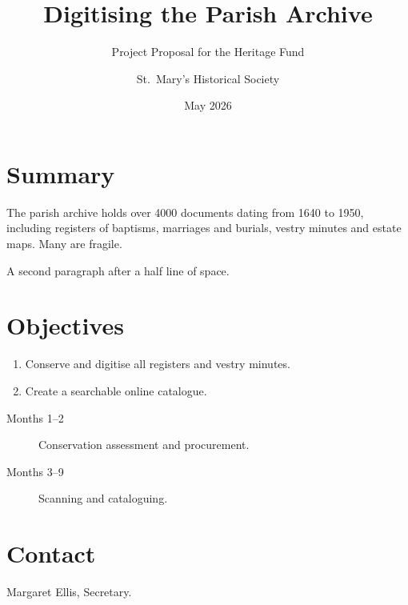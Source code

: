 \documentclass[paper=a4,fontsize=11pt,parskip=half]{scrartcl}
\title{Digitising the Parish Archive}
\subtitle{Project Proposal for the Heritage Fund}
\author{St.\ Mary's Historical Society}
\date{May 2026}
\begin{document}
\maketitle

\section{Summary}
The parish archive holds over 4000 documents dating from 1640 to 1950, including registers of baptisms, marriages and burials, vestry minutes and estate maps. Many are fragile.

A second paragraph after a half line of space.
\section{Objectives}
\begin{enumerate}
  \item Conserve and digitise all registers and vestry minutes.
  \item Create a searchable online catalogue.
\end{enumerate}
\begin{description}
  \item[Months 1--2] Conservation assessment and procurement.
  \item[Months 3--9] Scanning and cataloguing.
\end{description}
\section{Contact}
Margaret Ellis, Secretary.
\end{document}
